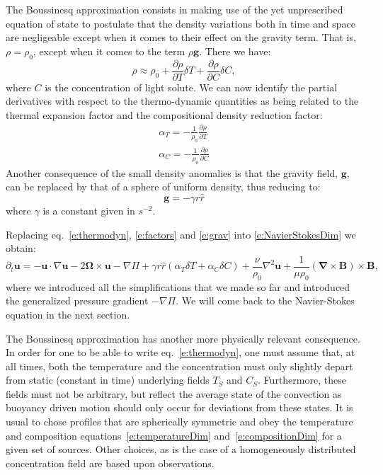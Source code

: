 \documentclass[a4paper,10pt]{book}
\renewcommand{\vec}[1]{\mathbf{#1}}
\begin{document}
The Boussinesq approximation consists in making use of the yet unprescribed
equation of state to postulate that the density variations both in time and
space are negligeable except when it comes to their effect on the gravity term.
That is, $\rho = \rho_0$, except when it comes to the term $\rho \vec{g}$. There
we have:
\begin{equation}
 \rho \approx \rho_0 + \frac{\partial \rho}{\partial T}\delta T + \frac{\partial \rho}{\partial C}\delta C,
\label{e:thermodyn}
\end{equation}
where $C$ is the concentration of light solute. We can now identify the partial
derivatives with respect to the thermo-dynamic quantities as being related to
the thermal expansion factor and the compositional density reduction factor:
\begin{subequations}
\begin{gather}
\alpha_T = -\frac{1}{\rho_0}\frac{\partial \rho}{\partial T} \\
\alpha_C = -\frac{1}{\rho_0}\frac{\partial \rho}{\partial C}
\end{gather}
\label{e:factors}
\end{subequations}
Another consequence of the small density anomalies is that the gravity field,
$\vec{g}$, can be replaced by that of a sphere of uniform density, thus reducing
to:
\begin{equation}
 \vec{g} = -\gamma r \hat{r}
\label{e:grav}
\end{equation}
where $\gamma$ is a constant given in $s^{-2}$.

Replacing eq.~\ref{e:thermodyn}, \ref{e:factors} and \ref{e:grav} into
\ref{e:NavierStokesDim} we obtain:
\begin{equation}
\partial_t \vec u = - \vec u \cdot \nabla \vec u -
 2\vec\Omega \times \vec u -\nabla \Pi +  \gamma r \hat{r}(\alpha_T \delta T + \alpha_C \delta C) +
\frac{\nu}{\rho_0}\nabla^2\vec{u}+ \frac{1}{\mu\rho_0}(\vec\nabla\times\vec B )\times\vec B,
\end{equation}
where we introduced all the simplifications that we made so far and introduced
the generalized pressure gradient $-\nabla \Pi$. We will come back to the
Navier-Stokes equation in the next section.

The Boussinesq approximation has another more physically relevant consequence.
In order for one to be able to write eq.~\ref{e:thermodyn}, one must assume
that, at all times, both the temperature and the concentration must only
slightly depart from static (constant in time) underlying fields $T_S$ and
$C_S$. Furthermore, these fields must not be arbitrary, but reflect the average
state of the convection as buoyancy driven motion should only occur for
deviations from these states. It is usual to chose profiles that are spherically
symmetric and obey the temperature and composition
equations~\ref{e:temperatureDim} and~\ref{e:compositionDim} for a given set of
sources. Other choices, as is the case of a homogeneously distributed
concentration field are based upon observations.
\end{document}
